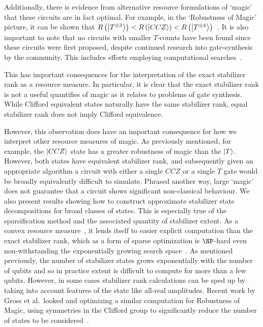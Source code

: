 Additionally, there is evidence from alternative resource formulations of `magic' that these circuits are in fact optimal. For example, in the `Robustness of Magic' picture, it can be shown that $R\left(\ket{T^{\otimes 3}}\right)<R\left(\ket{CCZ}\right)<R\left(\ket{T^{\otimes 4}}\right)$~\cite{Howard2017}. It is also important to note that no circuits with smaller $T$-counts have been found since these circuits were first proposed, despite continued research into gate-synthesis by the community. This includes efforts employing computational searches~\cite{Heyfron2018}.\par
This has important consequences for the interpretation of the exact stabilizer rank as a resource measure. In particular, it is clear that the exact stabilizer rank is not a useful quantifies of magic as it relates to problems of gate synthesis. While Clifford equivalent states naturally have the same stabilizer rank, equal stabilizer rank does not imply Clifford equivalence.\par
However, this observation does have an important consequence for how we interpret other resource measures of magic. As previously mentioned, for example, the $\ket{CCZ}$ state has a greater robustness of magic than the $\ket{T}$. However, both states have equivalent stabilizer rank, and subsequently given an appropriate algorithm a circuit with either a single $CCZ$ or a single $T$ gate would be broadly equivalently difficult to simulate. Phrased another way, large `magic' does not guarantee that a circuit shows significant non-classical behaviour.
We also present results showing how to construct approximate stabilizer state decompositions for broad classes of states. This is especially true of the sparsification method and the associated quantity of stabilizer extent. As a convex resource measure~\cite{Regula2018}, it lends itself to easier explicit computation than the exact stabilizer rank, which as a form of sparse optimization is $\NP$-hard even non-withstanding the exponentially growing search space~\cite{Natarajan1995}. As mentioned previously, the number of stabilizer states grows exponentially with the number of qubits and so in practice extent is difficult to compute for more than a few qubits. However, in some cases stabilizer rank calculations can be sped up by taking into account features of the state like all-real amplitudes. Recent work by Gross et al.\ looked and optimizing a similar computation for Robustness of Magic, using symmetries in the Clifford group to significantly reduce the number of states to be considered~\cite{Gross2017}.\par
